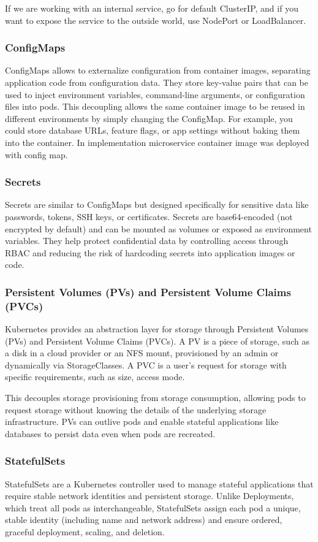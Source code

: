 If we are working with an internal service, go for default ClusterIP, and if you want to expose the service to the outside world, use NodePort or LoadBalancer.

\subsubsection{ConfigMaps}
ConfigMaps allows to externalize configuration from container images, separating application code from configuration data. They store key-value pairs that can be used to inject environment variables, command-line arguments, or configuration files into pods. This decoupling allows the same container image to be reused in different environments by simply changing the ConfigMap. For example, you could store database URLs, feature flags, or app settings without baking them into the container. In implementation microservice container image was deployed with config map.

\subsubsection{Secrets}
Secrets are similar to ConfigMaps but designed specifically for sensitive data like passwords, tokens, SSH keys, or certificates. Secrets are base64-encoded (not encrypted by default) and can be mounted as volumes or exposed as environment variables. They help protect confidential data by controlling access through RBAC and reducing the risk of hardcoding secrets into application images or code.

\subsubsection{Persistent Volumes (PVs) and Persistent Volume Claims (PVCs)}
Kubernetes provides an abstraction layer for storage through Persistent Volumes (PVs) and Persistent Volume Claims (PVCs). A PV is a piece of storage, such as a disk in a cloud provider or an NFS mount, provisioned by an admin or dynamically via StorageClasses. A PVC is a user's request for storage with specific requirements, such as size, access mode.

This decouples storage provisioning from storage consumption, allowing pods to request storage without knowing the details of the underlying storage infrastructure. PVs can outlive pods and enable stateful applications like databases to persist data even when pods are recreated.

\subsubsection{StatefulSets}
StatefulSets are a Kubernetes controller used to manage stateful applications that require stable network identities and persistent storage. Unlike Deployments, which treat all pods as interchangeable, StatefulSets assign each pod a unique, stable identity (including name and network address) and ensure ordered, graceful deployment, scaling, and deletion.

